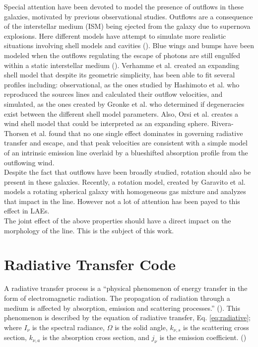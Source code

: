 Special attention have been devoted to model the presence of outflows in these galaxies, motivated by previous observational studies. Outflows are a consequence of the interstellar medium (ISM) being ejected from the galaxy due to supernova explosions. Here different models have attempt to simulate more realistic situations involving shell models and cavities (\cite{Behrens2014}). Blue wings and bumps have been modeled when the outflows regulating the escape of \lya photons are still engulfed within a static interstellar medium (\cite{Chung2015}). Verhamme et al. \cite{Verhamme06} created an expanding shell model that despite its geometric simplicity, has been able to fit several \lya profiles including: observational, as the ones studied by Hashimoto et al. \cite{Hashimoto2015} who reproduced the sources \lya lines and calculated their outflow velocities, and simulated, as the ones created by Gronke et al. \cite{Gronke2015} who determined if degeneracies exist between the different shell model parameters. Also, Orsi et al. \cite{Orsi12} creates a wind shell model that could be interpreted as an expanding sphere. Rivera-Thorsen et al. \cite{Rivera-Thorsen2015} found that no one single effect dominates in governing \lya radiative transfer and escape, and that \lya peak velocities are consistent with a simple model of an intrinsic emission line overlaid by a blueshifted absorption profile from the outﬂowing wind.\\

Despite the fact that outflows have been broadly studied, rotation should also be present in these galaxies. Recently, a rotation model, created by Garavito et al. \cite{Garavito14} models a rotating spherical galaxy with homogeneous gas mixture and analyzes that impact in the \lya line. However not a lot of attention has been payed to this effect in LAEs.\\

The joint effect of the above properties should have a direct impact on the morphology of the \lya line. This is the subject of this work. \\

\section{Radiative Transfer Code}

A radiative transfer process is a ``physical phenomenon of energy transfer in the form of electromagnetic radiation. The propagation of radiation through a medium is affected by absorption, emission and scattering processes.'' (\cite{Ryden2010}). This phenomenon is described by the equation of radiative transfer, Eq. \ref{eq:radiative}; where $I_{\nu}$ is the spectral radiance, $\Omega$ is the solid angle, $k_{\nu,s}$ is the scattering cross section, $k_{\nu,a}$ is the absorption cross section, and $j_{\nu}$ is the emission coefficient. (\cite{Chandrasekhar1950})

